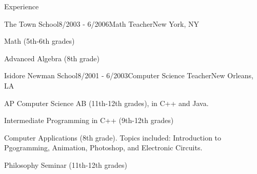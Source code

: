 \documentclass{resume} %
\begin{document}
\begin{rSection}{Experience}
\begin{rSubsection}{The Town School}{8/2003 - 6/2006}{Math Teacher}{New York, NY}
\item Math (5th-6th grades)
\item Advanced Algebra (8th grade)
\end{rSubsection}

\begin{rSubsection}{Isidore Newman School}{8/2001 - 6/2003}{Computer Science Teacher}{New Orleans, LA}
\item AP Computer Science AB (11th-12th grades), in C++ and Java.
\item Intermediate Programming in C++ (9th-12th grades)
\item Computer Applications (8th grade). Topics included: Introduction to Pgogramming, Animation, Photoshop, and Electronic Circuits.
\item Philosophy Seminar (11th-12th grades)
\end{rSubsection}

\end{rSection}






\end{document}
